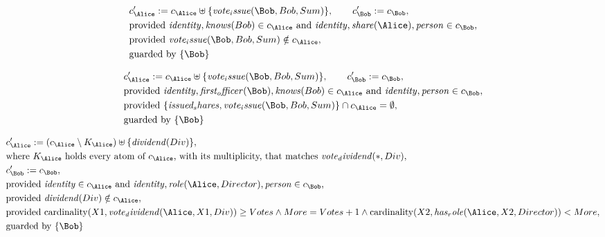 \begin{align*}
&
c'_
{
\Alice
}
 := 
c_
{
\Alice
}
 \uplus 
\{
\mathit{
vote_issue
}
(
\Bob
,
Bob
,
Sum
)
\}
, \qquad 
c'_
{
\Bob
}
 := 
c_
{
\Bob
}
,\\
&
\text{provided } 
\mathit{
identity
}
,
\mathit{
knows
}
(
Bob
)
 \in c_
{
\Alice
}
 \text{ and } 
\mathit{
identity
}
,
\mathit{
share
}
(
\Alice
)
,
\mathit{
person
}
 \in c_
{
\Bob
}
,\\
&
\text{provided } 
\mathit{
vote_issue
}
(
\Bob
,
Bob
,
Sum
)
 \notin c_
{
\Alice
}
,\\
&
\text{guarded by } \{
\Bob
\}
\end{align*}

\begin{align*}
&
c'_
{
\Alice
}
 := 
c_
{
\Alice
}
 \uplus 
\{
\mathit{
vote_issue
}
(
\Bob
,
Bob
,
Sum
)
\}
, \qquad 
c'_
{
\Bob
}
 := 
c_
{
\Bob
}
,\\
&
\text{provided } 
\mathit{
identity
}
,
\mathit{
first_officer
}
(
\Bob
)
,
\mathit{
knows
}
(
Bob
)
 \in c_
{
\Alice
}
 \text{ and } 
\mathit{
identity
}
,
\mathit{
person
}
 \in c_
{
\Bob
}
,\\
&
\text{provided } 
\{
\mathit{
issued_shares
}
,
\mathit{
vote_issue
}
(
\Bob
,
Bob
,
Sum
)
\}
 \cap c_
{
\Alice
}
 = \emptyset
,\\
&
\text{guarded by } \{
\Bob
\}
\end{align*}

\begin{align*}
&
c'_
{
\Alice
}
 := 
(
c_
{
\Alice
}
 \setminus K_
{
\Alice
}
) \uplus 
\{
\mathit{
dividend
}
(
Div
)
\}
,\\
&
\text{where } K_
{
\Alice
}
 \text{ holds every atom of } c_
{
\Alice
}
 \text{, with its multiplicity, that matches } 
\mathit{
vote_dividend
}
(
\ast
,
Div
)
,\\
&
c'_
{
\Bob
}
 := 
c_
{
\Bob
}
,\\
&
\text{provided } 
\mathit{
identity
}
 \in c_
{
\Alice
}
 \text{ and } 
\mathit{
identity
}
,
\mathit{
role
}
(
\Alice
,
Director
)
,
\mathit{
person
}
 \in c_
{
\Bob
}
,\\
&
\text{provided } 
\mathit{
dividend
}
(
Div
)
 \notin c_
{
\Alice
}
,\\
&
\text{provided } 
\mathrm{cardinality}(
X1
,
\mathit{
vote_dividend
}
(
\Alice
,
X1
,
Div
)
)
\ge
Votes
\land
More
=
Votes
+
1
\land
\mathrm{cardinality}(
X2
,
\mathit{
has_role
}
(
\Alice
,
X2
,
Director
)
)
<
More
,\\
&
\text{guarded by } \{
\Bob
\}
\end{align*}
